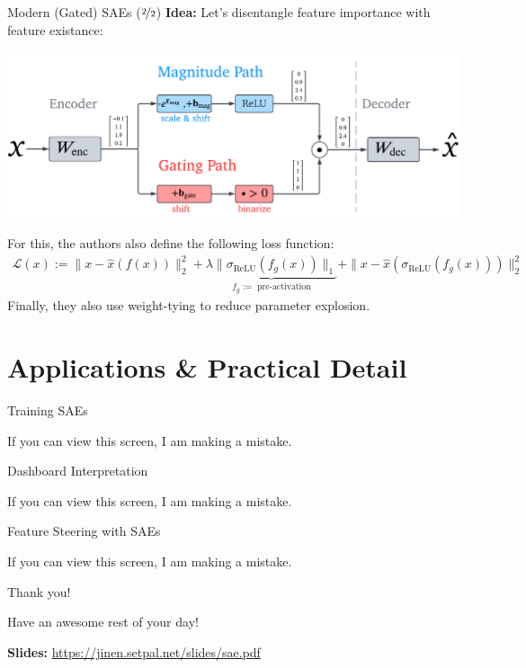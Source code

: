 \documentclass{beamer}
\begin{document}
\begin{frame}{Modern (Gated) SAEs ($\nicefrac{2}{2}$)}
	\textbf{Idea:} Let's disentangle feature importance with feature existance:
	\begin{center}
		\includegraphics[width=.85\textwidth]{img/gated-sae.pdf}
	\end{center} \pause
	\vspace{-1em}

	For this, the authors also define the following loss function:
	\begin{gather*}
		\mathcal{L}(x) := \|x - \hat{x}(f(x)) \|^2_2 + \underbrace{\lambda \| \sigma_{\text{ReLU}} (f_{g}(x)) \|_1}_{f_g := \text{ pre-activation}} + \| x - \hat{x}(\sigma_{\text{ReLU}}(f_g(x))) \|^2_2
	\end{gather*} \pause
	Finally, they also use weight-tying to reduce parameter explosion.
\end{frame}

\section{Applications \& Practical Detail}
\begin{frame}{Training SAEs}
	\begin{center}
		If you can view this screen, I am making a mistake.
	\end{center}
\end{frame}

\begin{frame}{Dashboard Interpretation}
	\begin{center}
		If you can view this screen, I am making a mistake.
	\end{center}
\end{frame}

\begin{frame}{Feature Steering with SAEs}
	\begin{center}
		If you can view this screen, I am making a mistake.
	\end{center}
\end{frame}

\begin{frame}{Thank you!}
	\begin{center}
		Have an awesome rest of your day!
	\end{center}
	\begin{center}
		\textbf{Slides:} \url{https://jinen.setpal.net/slides/sae.pdf}
	\end{center}
\end{frame}
\end{document}
